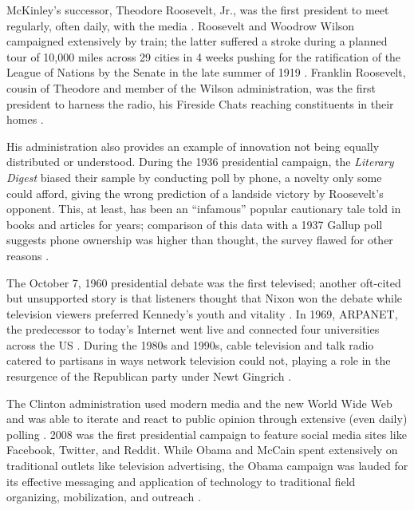 McKinley's successor, Theodore Roosevelt, Jr., was the first president to meet regularly, often daily, with the media \cite{juergens1982}.
Roosevelt and Woodrow Wilson campaigned extensively by train; the latter suffered a stroke during a planned tour of 10,000 miles across 29 cities in 4 weeks pushing for the ratification of the League of Nations by the Senate in the late summer of 1919 \cite[p. 15]{berg2013}.
Franklin Roosevelt, cousin of Theodore and member of the Wilson administration, was the first president to harness the radio, his Fireside Chats reaching constituents in their homes \cite{craig2000}.

His administration also provides an example of innovation not being equally distributed or understood.
During the 1936 presidential campaign, the \emph{Literary Digest} biased their sample by conducting poll by phone, a novelty only some could afford, giving the wrong prediction of a landside victory by Roosevelt's opponent.
This, at least, has been an ``infamous'' popular cautionary tale told in books and articles for years; comparison of this data with a 1937 Gallup poll suggests phone ownership was higher than thought, the survey flawed for other reasons \cite{squire1988}.

The October 7, 1960 presidential debate was the first televised; another oft-cited but unsupported story is that listeners thought that Nixon won the debate while television viewers preferred Kennedy's youth and vitality \cite{vancil1987}.
In 1969, ARPANET, the predecessor to today's Internet went live and connected four universities across the US \cite{denning1989}.
During the 1980s and 1990s, cable television and talk radio catered to partisans in ways network television could not, playing a role in the resurgence of the Republican party under Newt Gingrich \cite{lee2001}.

The Clinton administration used modern media and the new World Wide Web and was able to iterate and react to public opinion through extensive (even daily) polling \cite{heith2004}.
2008 was the first presidential campaign to feature social media sites like Facebook, Twitter, and Reddit.
While Obama and McCain spent extensively on traditional outlets like television advertising, the Obama campaign was lauded for its effective messaging and application of technology to traditional field organizing, mobilization, and outreach \cite{hendricks2010, mckenna2014}.

